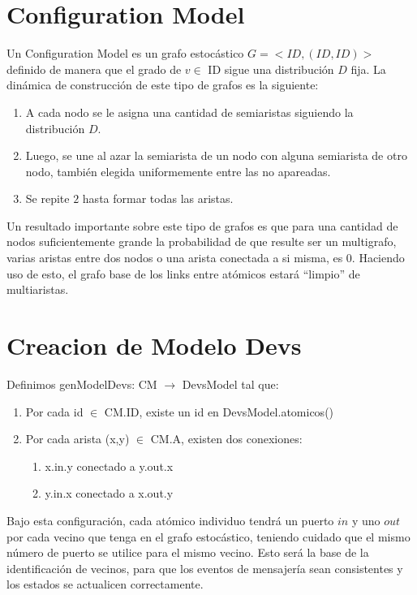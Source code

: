 \documentclass[10pt,a4paper]{article}
\begin{document}
\section*{Configuration Model}


Un Configuration Model es un grafo estoc\'astico $G=<ID,{(ID,ID)}>$ definido de manera que el grado de $v \in$ ID  sigue una distribuci\'on $D$ fija.
La din\'amica de construcci\'on de este tipo de grafos es la siguiente:
\begin{enumerate}
\item A cada nodo se le asigna una cantidad de semiaristas siguiendo la distribuci\'on $D$.
\item Luego, se une al azar la semiarista de un nodo con alguna semiarista de otro nodo, tambi\'en elegida uniformemente entre las no apareadas.
\item Se repite $2$ hasta formar todas las aristas.
\end{enumerate}

Un resultado importante sobre este tipo de grafos es que para una cantidad de nodos suficientemente grande la probabilidad de que resulte ser un multigrafo, varias aristas entre dos nodos o una arista conectada a si misma, es 0. Haciendo uso de esto, el grafo base de los links entre at\'omicos estar\'a ``limpio'' de multiaristas.


\section*{Creacion de Modelo Devs}


Definimos genModelDevs: CM $\rightarrow$ DevsModel tal que:
\begin{enumerate}
\item Por cada id $\in$ CM.ID, existe un id en DevsModel.atomicos()
\item Por cada arista (x,y)  $\in$ CM.A, existen dos conexiones:
\begin{enumerate}
\item x.in.y conectado a y.out.x
\item y.in.x conectado a x.out.y
\end{enumerate}

\end{enumerate}
Bajo esta configuraci\'on, cada at\'omico individuo tendr\'a un puerto $in$ y uno $out$ por cada vecino que tenga en el grafo estoc\'astico, teniendo cuidado que el mismo n\'umero de puerto se utilice para el mismo vecino. Esto ser\'a la base de la identificaci\'on de vecinos, para que los eventos de mensajer\'ia sean consistentes y los estados se actualicen correctamente. 
\end{document}
